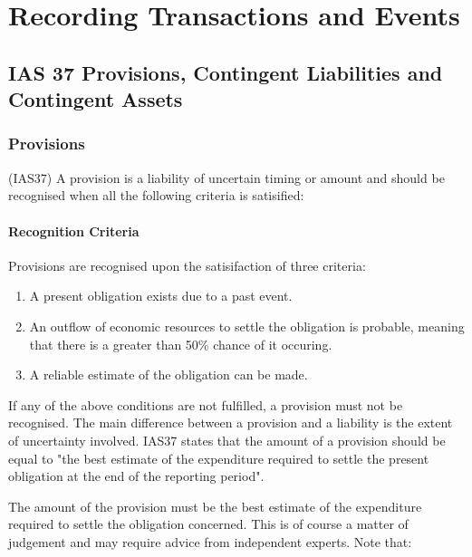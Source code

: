 \chapter{Recording Transactions and Events}

\section{IAS 37 Provisions, Contingent Liabilities and Contingent Assets}

\subsection{Provisions}

(IAS37) A provision is a liability of uncertain timing or amount and should be recognised when all the following criteria is satisified:

\subsubsection{Recognition Criteria}

Provisions are recognised upon the satisifaction of three criteria: 

\begin{enumerate}
    \item A present obligation exists due to a past event.
    \item An outflow of economic resources to settle the obligation is probable, meaning that there is a greater than 50\% chance of it occuring.
    \item A reliable estimate of the obligation can be made.
\end{enumerate}

If any of the above conditions are not fulfilled, a provision must not be recognised.
The main difference between a provision and a liability is the extent of uncertainty involved. IAS37 states that the amount of a provision should be equal to "the best estimate of the 
expenditure required to settle the present obligation at the end of the reporting period". 


The amount of the provision must be the best estimate of the expenditure required to settle the obligation concerned. This is of course a matter of judgement and may require advice from independent experts. Note that: 

